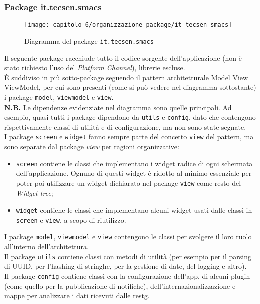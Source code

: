 \subsubsection{Package it.tecsen.smacs}
\label{subsubsec:it-tecsen-smacs}

\begin{figure}[!h] 
  \centering 
  \texttt{[image: capitolo-6/organizzazione-package/it-tecsen-smacs]} 
  \caption{Diagramma del package \texttt{it.tecsen.smacs}}
\end{figure}
Il seguente package racchiude tutto il codice sorgente dell'applicazione (non è stato richiesto l'uso del \emph{Platform Channel}), librerie escluse.\\
È suddiviso in più sotto-package seguendo il pattern architetturale Model View ViewModel, per cui sono presenti (come si può vedere nel diagramma sottostante) i package \texttt{model}, \texttt{viewmodel} e \texttt{view}.\\
\textbf{N.B.} Le dipendenze evidenziate nel diagramma sono quelle principali. Ad esempio, quasi tutti i package dipendono da \texttt{utils} e \texttt{config}, dato che contengono rispettivamente classi di utilità e di configurazione, ma non sono state segnate.\\
I package \texttt{screen} e \texttt{widget} fanno sempre parte del concetto \texttt{view} del pattern, ma sono separate dal package \emph{view} per ragioni organizzative:
\begin{itemize}
  \item \texttt{screen} contiene le classi che implementano i widget radice di ogni schermata dell'applicazione. Ognuno di questi widget è ridotto al minimo essenziale per poter poi utilizzare un widget dichiarato nel package \texttt{view} come resto del \emph{Widget tree};
  \item \texttt{widget} contiene le classi che implementano alcuni widget usati dalle classi in \texttt{screen} e \texttt{view}, a scopo di riutilizzo.
\end{itemize}
I package \texttt{model}, \texttt{viewmodel} e \texttt{view} contengono le classi per svolgere il loro ruolo all'interno dell'architettura.\\
Il package \texttt{utils} contiene classi con metodi di utilità (per esempio per il parsing di UUID, per l'hashing di stringhe, per la gestione di date, del logging e altro).\\
Il package \texttt{config} contiene classi con la configurazione dell'app, di alcuni plugin (come quello per la pubblicazione di notifiche), dell'internazionalizzazione e mappe per analizzare i dati ricevuti dalle \gls{restg}.\\
